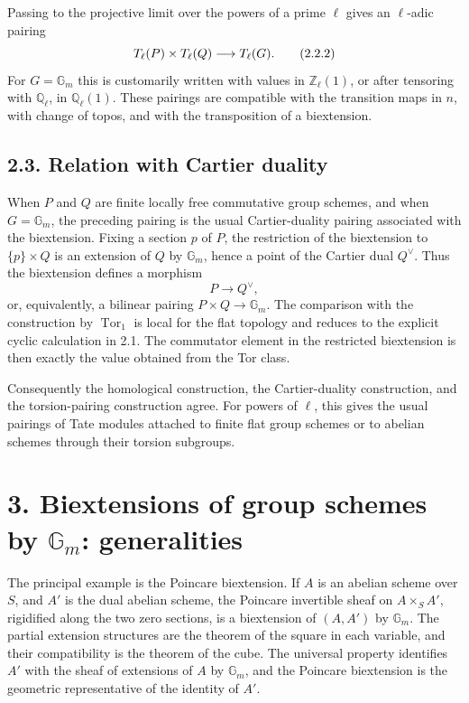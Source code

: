 \documentclass[11pt]{article}
\providecommand{\Tor}{\operatorname{Tor}}
\providecommand{\Ql}{\mathbb Q_\ell}
\providecommand{\Zl}{\mathbb Z_\ell}
\providecommand{\Gm}{\mathbb G_m}
\begin{document}
Passing to the projective limit over the powers of a prime \(\ell\) gives an \(\ell\)-adic pairing
\[
        T_\ell(P)\times T_\ell(Q)
        \longrightarrow T_\ell(G).
\qquad\text{(2.2.2)}
\]
For \(G=\Gm\) this is customarily written with values in \(\Zl(1)\), or after tensoring with \(\Ql\), in \(\Ql(1)\).  These pairings are compatible with the transition maps in \(n\), with change of topos, and with the transposition of a biextension.

\subsection*{2.3. Relation with Cartier duality}

When \(P\) and \(Q\) are finite locally free commutative group schemes, and when \(G=\Gm\), the preceding pairing is the usual Cartier-duality pairing associated with the biextension.  Fixing a section \(p\) of \(P\), the restriction of the biextension to \(\{p\}\times Q\) is an extension of \(Q\) by \(\Gm\), hence a point of the Cartier dual \(Q^\vee\).  Thus the biextension defines a morphism
\[
        P\longrightarrow Q^\vee,
\]
or, equivalently, a bilinear pairing \(P\times Q\to \Gm\).  The comparison with the construction by \(\Tor_1\) is local for the flat topology and reduces to the explicit cyclic calculation in 2.1.  The commutator element in the restricted biextension is then exactly the value obtained from the Tor class.

Consequently the homological construction, the Cartier-duality construction, and the torsion-pairing construction agree.  For powers of \(\ell\), this gives the usual pairings of Tate modules attached to finite flat group schemes or to abelian schemes through their torsion subgroups.

\section*{3. Biextensions of group schemes by \(\Gm\): generalities}

The principal example is the Poincare biextension.  If \(A\) is an abelian scheme over \(S\), and \(A'\) is the dual abelian scheme, the Poincare invertible sheaf on \(A\times_S A'\), rigidified along the two zero sections, is a biextension of \((A,A')\) by \(\Gm\).  The partial extension structures are the theorem of the square in each variable, and their compatibility is the theorem of the cube.  The universal property identifies \(A'\) with the sheaf of extensions of \(A\) by \(\Gm\), and the Poincare biextension is the geometric representative of the identity of \(A'\).
\end{document}
